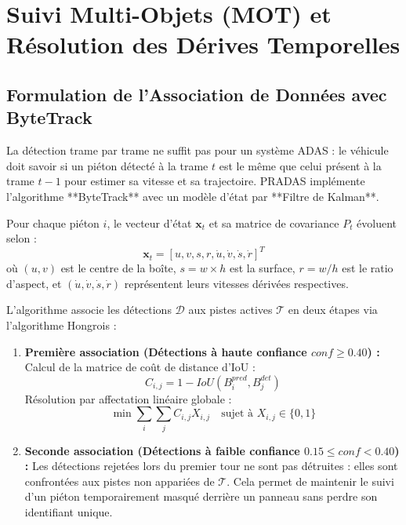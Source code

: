 \documentclass[11pt,a4paper]{article}
\begin{document}
\section{Suivi Multi-Objets (MOT) et Résolution des Dérives Temporelles}

\subsection{Formulation de l'Association de Données avec ByteTrack}
La détection trame par trame ne suffit pas pour un système ADAS : le véhicule doit savoir si un piéton détecté à la trame $t$ est le même que celui présent à la trame $t-1$ pour estimer sa vitesse et sa trajectoire.
PRADAS implémente l'algorithme **ByteTrack** avec un modèle d'état par **Filtre de Kalman**.

Pour chaque piéton $i$, le vecteur d'état $\mathbf{x}_t$ et sa matrice de covariance $P_t$ évoluent selon :
\begin{equation}
    \mathbf{x}_t = [u, v, s, r, \dot{u}, \dot{v}, \dot{s}, \dot{r}]^T
\end{equation}
où $(u, v)$ est le centre de la boîte, $s = w \times h$ est la surface, $r = w / h$ est le ratio d'aspect, et $(\dot{u}, \dot{v}, \dot{s}, \dot{r})$ représentent leurs vitesses dérivées respectives.

L'algorithme associe les détections $\mathcal{D}$ aux pistes actives $\mathcal{T}$ en deux étapes via l'algorithme Hongrois :
\begin{enumerate}
    \item \textbf{Première association (Détections à haute confiance $conf \ge 0.40$) :}
    Calcul de la matrice de coût de distance d'IoU :
    \begin{equation}
        C_{i,j} = 1 - IoU(B_i^{pred}, B_j^{det})
    \end{equation}
    Résolution par affectation linéaire globale :
    \begin{equation}
        \min \sum_{i} \sum_{j} C_{i,j} X_{i,j} \quad \text{sujet à } X_{i,j} \in \{0, 1\}
    \end{equation}
    
    \item \textbf{Seconde association (Détections à faible confiance $0.15 \le conf < 0.40$) :}
    Les détections rejetées lors du premier tour ne sont pas détruites : elles sont confrontées aux pistes non appariées de $\mathcal{T}$. Cela permet de maintenir le suivi d'un piéton temporairement masqué derrière un panneau sans perdre son identifiant unique.
\end{enumerate}
\end{document}
